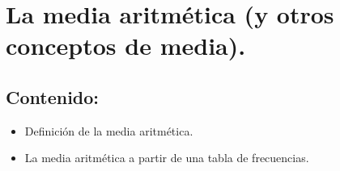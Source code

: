 
%
%
%
%

\section{La media aritmética (y otros conceptos de media).}

\subsection*{Contenido:}
\begin{itemize}
 \item Definición de la media aritmética.
 \item La media aritmética a partir de una tabla de frecuencias.
\end{itemize}

